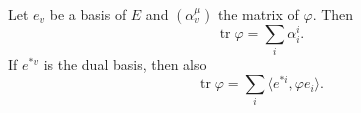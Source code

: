 Let $e_v$ be a basis of $E$ and $(\alpha_v^\mu)$ the matrix of $\varphi$. Then
$$\operatorname{tr} \varphi = \sum_i \alpha_i^i.$$
If $e^{*v}$ is the dual basis, then also
$$\operatorname{tr} \varphi = \sum_i \langle e^{*i}, \varphi e_i \rangle.$$
